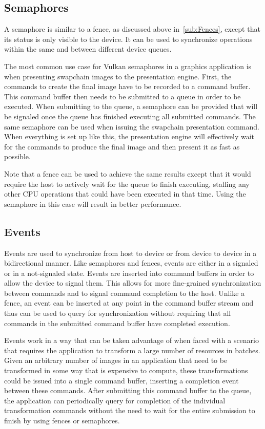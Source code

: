     \subsection{Semaphores}
    \label{sub:Semaphores}
      A semaphore is similar to a fence, as discussed above in~\ref{sub:Fences}, except that its status is only visible to the device. It can be used to synchronize operations within the same and between different device queues.

      The most common use case for Vulkan semaphores in a graphics application is when presenting swapchain images to the presentation engine. First, the commands to create the final image have to be recorded to a command buffer. This command buffer then needs to be submitted to a queue in order to be executed. When submitting to the queue, a semaphore can be provided that will be signaled once the queue has finished executing all submitted commands. The same semaphore can be used when issuing the swapchain presentation command. When everything is set up like this, the presentation engine will effectively wait for the commands to produce the final image and then present it as fast as possible.

      Note that a fence can be used to achieve the same results except that it would require the host to actively wait for the queue to finish executing, stalling any other CPU operations that could have been executed in that time. Using the semaphore in this case will result in better performance.

    \subsection{Events}
    \label{sub:Events}
      Events are used to synchronize from host to device or from device to device in a bidirectional manner. Like semaphores and fences, events are either in a signaled or in a not-signaled state. Events are inserted into command buffers in order to allow the device to signal them. This allows for more fine-grained synchronization between commands and to signal command completion to the host. Unlike a fence, an event can be inserted at any point in the command buffer stream and thus can be used to query for synchronization without requiring that all commands in the submitted command buffer have completed execution.

      Events work in a way that can be taken advantage of when faced with a scenario that requires the application to transform a large number of resources in batches. Given an arbitrary number of images in an application that need to be transformed in some way that is expensive to compute, these transformations could be issued into a single command buffer, inserting a completion event between these commands. After submitting this command buffer to the queue, the application can periodically query for completion of the individual transformation commands without the need to wait for the entire submission to finish by using fences or semaphores.

